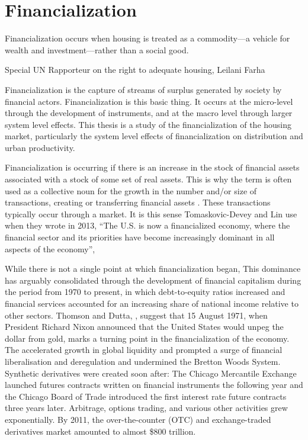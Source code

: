 \chapter{Financialization} \label{chapter-financialization}
\epigraph{Financialization occurs when housing is treated as a commodity---a vehicle for wealth and investment---rather than a social good.}{Special UN Rapporteur on the right to adequate housing, Leilani Farha \cite{farhaReportFinancializationHousing2017}}

Financialization is the capture of streams of surplus generated by society by financial actors. Financialization is this basic thing. It occurs at the micro-level through the development of instruments, and at the macro level through larger system level effects.
This thesis is a study of the financialization of the housing market, particularly the system level effects of financialization on distribution and urban productivity. 

Financialization is occurring if there is an increase in the stock of financial assets associated with a stock of some set of real assets. This is why the term is often used as a collective noun for the growth in the number and/or size of  transactions, creating or transferring financial assets \cite{GET_financialization-numberOfTransactions}. These transactions typically occur through a \gls{market}.  
It is this sense  Tomaskovic-Devey and Lin use when they wrote in 2013, ``The U.S. is now a financialized economy, where the financial sector and its priorities have become increasingly dominant in all aspects of the economy''\cite{tomaskovic-deveyFinancializationCausesInequality2013}, 

While there is not a single point at which financialization began, 
This dominance has arguably consolidated through the development of financial capitalism during the period from 1970 to present, in which debt-to-equity ratios increased and financial services accounted for an increasing share of national income relative to other sectors. Thomson and Dutta, \cite{thomsonFinancialisationPrimer2018}, suggest that 15 August 1971, when President Richard Nixon announced that the United States would unpeg the dollar from gold, marks a turning point in the financialization of the economy. The accelerated growth in global liquidity and prompted a surge of financial liberalisation and deregulation and undermined the Bretton Woods System.  Synthetic derivatives were created soon after: The Chicago Mercantile Exchange launched futures contracts written on financial instruments the following year and the Chicago Board of Trade introduced the first interest rate future contracts three years later. Arbitrage, options trading, and various other activities grew exponentially. By 2011, the over-the-counter (OTC) and exchange-traded derivatives market amounted to almost \$800 trillion.  %

